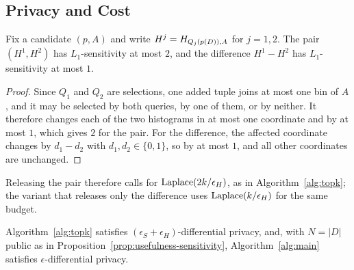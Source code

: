 \subsection{Privacy and Cost}
\label{subsec:dp-proof}

\begin{proposition}
\label{prop:histogram-release-sensitivity}
Fix a candidate $(p,A)$ and write $H^j=H_{Q_j(p(D)),A}$ for $j=1,2$.
The pair $(H^1,H^2)$ has $L_1$-sensitivity at most $2$, and the difference $H^1-H^2$ has $L_1$-sensitivity at most $1$.
\end{proposition}

\begin{proof}
Since $Q_1$ and $Q_2$ are selections, one added tuple joins at most one bin of $A$, and it may be selected by both queries, by one of them, or by neither.
It therefore changes each of the two histograms in at most one coordinate and by at most $1$, which gives $2$ for the pair.
For the difference, the affected coordinate changes by $d_1-d_2$ with $d_1,d_2\in\{0,1\}$, so by at most $1$, and all other coordinates are unchanged.
\end{proof}

Releasing the pair therefore calls for $\operatorname{Laplace}(2k/\epsilon_H)$, as in Algorithm~\ref{alg:topk}; the variant that releases only the difference uses $\operatorname{Laplace}(k/\epsilon_H)$ for the same budget.

\begin{proposition}
\label{thm:alg1-dp}
Algorithm~\ref{alg:topk} satisfies $(\epsilon_S+\epsilon_H)$-differential privacy, and, with $N=|D|$ public as in Proposition~\ref{prop:usefulness-sensitivity}, Algorithm~\ref{alg:main} satisfies $\epsilon$-differential privacy.
\end{proposition}

